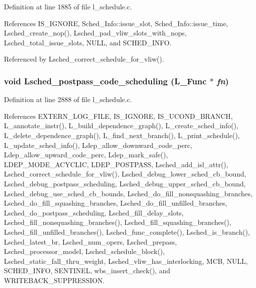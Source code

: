 Definition at line 1885 of file l\_\-schedule.c.

References IS\_\-IGNORE, Sched\_\-Info::issue\_\-slot, Sched\_\-Info::issue\_\-time, Lsched\_\-create\_\-nop(), Lsched\_\-pad\_\-vliw\_\-slots\_\-with\_\-nops, Lsched\_\-total\_\-issue\_\-slots, NULL, and SCHED\_\-INFO.

Referenced by Lsched\_\-correct\_\-schedule\_\-for\_\-vliw().
\subsubsection{\setlength{\rightskip}{0pt plus 5cm}void Lsched\_\-postpass\_\-code\_\-scheduling (L\_\-Func $\ast$ {\em fn})}\label{l__schedule_8c_97697bfbdf7be22085fc3d8b3f177d72}




Definition at line 2888 of file l\_\-schedule.c.

References EXTERN\_\-LOG\_\-FILE, IS\_\-IGNORE, IS\_\-UCOND\_\-BRANCH, L\_\-annotate\_\-instr(), L\_\-build\_\-dependence\_\-graph(), L\_\-create\_\-sched\_\-info(), L\_\-delete\_\-dependence\_\-graph(), L\_\-find\_\-next\_\-branch(), L\_\-print\_\-schedule(), L\_\-update\_\-sched\_\-info(), Ldep\_\-allow\_\-downward\_\-code\_\-perc, Ldep\_\-allow\_\-upward\_\-code\_\-perc, Ldep\_\-mark\_\-safe(), LDEP\_\-MODE\_\-ACYCLIC, LDEP\_\-POSTPASS, Lsched\_\-add\_\-isl\_\-attr(), Lsched\_\-correct\_\-schedule\_\-for\_\-vliw(), Lsched\_\-debug\_\-lower\_\-sched\_\-cb\_\-bound, Lsched\_\-debug\_\-postpass\_\-scheduling, Lsched\_\-debug\_\-upper\_\-sched\_\-cb\_\-bound, Lsched\_\-debug\_\-use\_\-sched\_\-cb\_\-bounds, Lsched\_\-do\_\-fill\_\-nonsquashing\_\-branches, Lsched\_\-do\_\-fill\_\-squashing\_\-branches, Lsched\_\-do\_\-fill\_\-unfilled\_\-branches, Lsched\_\-do\_\-postpass\_\-scheduling, Lsched\_\-fill\_\-delay\_\-slots, Lsched\_\-fill\_\-nonsquashing\_\-branches(), Lsched\_\-fill\_\-squashing\_\-branches(), Lsched\_\-fill\_\-unfilled\_\-branches(), Lsched\_\-func\_\-complete(), Lsched\_\-is\_\-branch(), Lsched\_\-latest\_\-br, Lsched\_\-num\_\-opers, Lsched\_\-prepass, Lsched\_\-processor\_\-model, Lsched\_\-schedule\_\-block(), Lsched\_\-static\_\-fall\_\-thru\_\-weight, Lsched\_\-vliw\_\-has\_\-interlocking, MCB, NULL, SCHED\_\-INFO, SENTINEL, wbs\_\-insert\_\-check(), and WRITEBACK\_\-SUPPRESSION.
